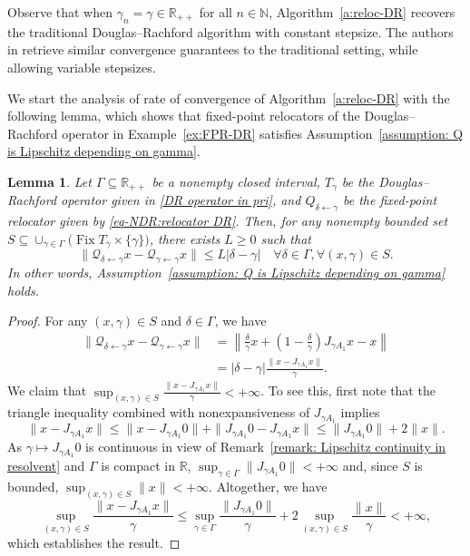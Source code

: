 \documentclass[a4paper,12pt]{article}
\newtheorem{lemma}[theorem]{Lemma}
\DeclareMathOperator{\Fix}{Fix}
\begin{document}
Observe that when $\gamma_n = \gamma \in \mathbb{R}_{++}$ for all $n \in \mathbb{N}$, Algorithm~\ref{a:reloc-DR} recovers the  traditional Douglas--Rachford algorithm with constant stepsize. The authors in \cite{lorenz2019non,atenas2025relocated} retrieve similar convergence guarantees to the traditional setting, while allowing variable stepsizes.

We start the analysis of rate of convergence of Algorithm~\ref{a:reloc-DR} with the following lemma, which shows that fixed-point relocators of the Douglas--Rachford operator in Example~\ref{ex:FPR-DR} satisfies Assumption~\ref{assumption: Q is Lipschitz depending on gamma}.
\begin{lemma}\label{lemma: DR relocator Lipschitz}
Let $\Gamma\subseteq\mathbb{R}_{++}$ be a nonempty closed interval, $T_\gamma$ be the Douglas--Rachford operator given in \eqref{DR operator in pri}, and $Q_{\delta\leftarrow\gamma}$ be the fixed-point relocator given by \eqref{eq-NDR:relocator DR}. Then, for any nonempty bounded set $S\subseteq\cup_{\gamma\in \Gamma}\bigl(\Fix T_{\gamma}\times\{\gamma\}\bigr)$, there exists $L\geq 0$ such that 
$$ \|\mathcal{Q}_{\delta\leftarrow\gamma}x-\mathcal{Q}_{\gamma\leftarrow\gamma}x\| \leq L|\delta-\gamma| \quad\forall\delta\in\Gamma,\forall (x,\gamma)\in S. $$
In other words, Assumption~\ref{assumption: Q is Lipschitz depending on gamma}  holds.
\end{lemma}
\begin{proof}
For any $(x,\gamma)\in S$ and $\delta\in\Gamma$, we have
\begin{equation}\label{eq-NDR: Lipschitz for DR}
        \begin{aligned}
            \|\mathcal{Q}_{\delta\leftarrow\gamma}x-\mathcal{Q}_{\gamma\leftarrow\gamma}x\|
            &=\left\|\frac{\delta}{\gamma}x+\left(1-\frac{\delta}{\gamma}\right)J_{\gamma A_1}x-x\right\|\\
            &=|\delta-\gamma|\frac{\|x-J_{\gamma A_1}x\|}{\gamma}.
        \end{aligned}
    \end{equation}
We claim that $\sup_{(x,\gamma)\in S}\frac{\|x-J_{\gamma A_1}x\|}{\gamma}<+\infty$. To see this, first note that the triangle inequality combined with nonexpansiveness of $J_{\gamma A_1}$ implies
 $$ \|x-J_{\gamma A_1}x\| \leq \|x-J_{\gamma A_1}0\|+\|J_{\gamma A_1}0-J_{\gamma A_1}x\| \leq \|J_{\gamma A_1}0\|+2\|x\|. $$
As $\gamma\mapsto J_{\gamma A_1}0$ is continuous in view of Remark~\ref{remark: Lipschitz continuity in resolvent} and $\Gamma$ is compact in $\mathbb{R}$, $\sup_{\gamma\in\Gamma}\|J_{\gamma A_1}0\|<+\infty$ and, since $S$ is bounded, $\sup_{(x,\gamma)\in S}\|x\|<+\infty$. Altogether, we have
$$ \sup_{(x,\gamma)\in S}\frac{\|x-J_{\gamma A_1}x\|}{\gamma} \leq \sup_{\gamma\in\Gamma}\frac{\|J_{\gamma A_1}0\|}{\gamma}+2\sup_{(x,\gamma)\in S}\frac{\|x\|}{\gamma} <+\infty, $$
which establishes the result. 
\end{proof}
\end{document}
